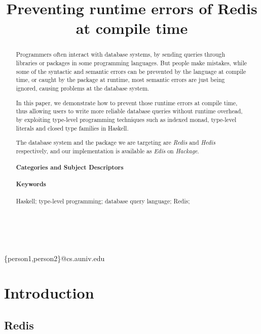 \documentclass[pldi]{sigplanconf-pldi16}
\begin{document}
\title{Preventing runtime errors of Redis at compile time}

%
%

{ \\
  \\
}
{\{person1,person2\}@cs.auniv.edu}

\maketitle

\begin{abstract}
Programmers often interact with database systems, by sending queries through
 libraries or packages in some programming languages. But people make mistakes,
 while some of the syntactic and semantic errors can be prevented by the
 language at compile time, or caught by the package at runtime, most semantic
 errors are just being ignored, causing problems at the database system.

In this paper, we demonstrate how to prevent those runtime errors at compile
 time, thus allowing users to write more reliable database queries without
 runtime overhead, by exploiting type-level programming techniques such as
 indexed monad, type-level literals and closed type families in Haskell.

The database system and the package we are targeting are \emph{Redis} and
 \emph{Hedis} respectively, and our implementation is available as \emph{Edis}
 on \emph{Hackage}.

\paragraph{Categories and Subject Descriptors}
\paragraph{Keywords}
Haskell; type-level programming; database query language; Redis;
\end{abstract}

\section{Introduction}

\subsection{Redis}
\end{document}
